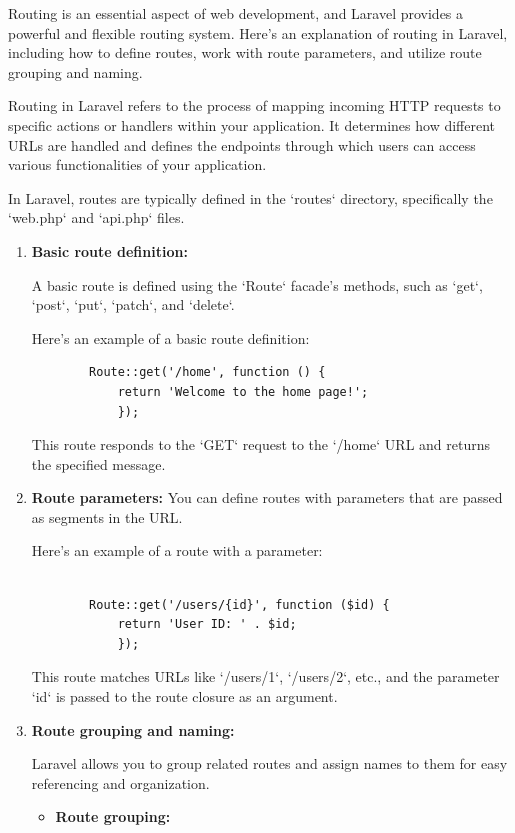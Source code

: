 Routing is an essential aspect of web development, and Laravel provides a powerful and flexible routing system. Here's an explanation of routing in Laravel, including how to define routes, work with route parameters, and utilize route grouping and naming.

Routing in Laravel refers to the process of mapping incoming HTTP requests to specific actions or handlers within your application. It determines how different URLs are handled and defines the endpoints through which users can access various functionalities of your application.

In Laravel, routes are typically defined in the `routes` directory, specifically the `web.php` and `api.php` files.
\begin{enumerate}
    \item \textbf{Basic route definition:} 
    
    A basic route is defined using the `Route` facade's methods, such as `get`, `post`, `put`, `patch`, and `delete`.
    
    \medskip Here's an example of a basic route definition:
    \begin{verbatim}
        Route::get('/home', function () {
            return 'Welcome to the home page!';
            });       
         \end{verbatim}
     
   This route responds to the `GET` request to the `/home` URL and returns the specified message.

 \item \textbf{Route parameters:}
   You can define routes with parameters that are passed as segments in the URL.
   
   \medskip Here's an example of a route with a parameter:
     \begin{verbatim}
        
        Route::get('/users/{id}', function ($id) {
            return 'User ID: ' . $id;
            });
        \end{verbatim}

    This route matches URLs like `/users/1`, `/users/2`, etc., and the parameter `{id}` is passed to the route closure as an argument.

\item \textbf{Route grouping and naming:}

Laravel allows you to group related routes and assign names to them for easy referencing and organization.
\begin{itemize}
    \item \textbf{Route grouping:}
    

\end{itemize}
\end{enumerate}
